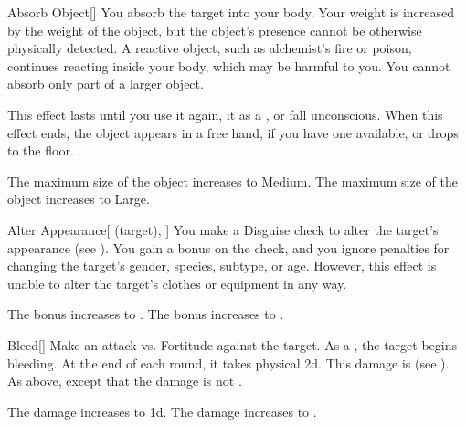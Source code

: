 \lowercase{\hypertarget{spell:Absorb Object}{}}\label{spell:Absorb Object}
\begin{freeability}[Rank 3]{\hypertarget{spell:Absorb Object}{Absorb Object}}[]
You absorb the target into your body.
Your weight is increased by the weight of the object, but the object's presence cannot be otherwise physically detected.
A reactive object, such as alchemist's fire or poison, continues reacting inside your body, which may be harmful to you.
You cannot absorb only part of a larger object.

This effect lasts until you use it again,  it as a , or fall unconscious.
When this effect ends, the object appears in a free hand, if you have one available, or drops to the floor.

\rankline
{} The maximum size of the object increases to Medium.
 The maximum size of the object increases to Large.
\end{freeability}
\vspace{0.25em}



\lowercase{\hypertarget{spell:Alter Appearance}{}}\label{spell:Alter Appearance}
\begin{attuneability}[Rank 3]{\hypertarget{spell:Alter Appearance}{Alter Appearance}}[ (target), ]
You make a Disguise check to alter the target's appearance (see ).
You gain a  bonus on the check, and you ignore penalties for changing the target's gender, species, subtype, or age.
However, this effect is unable to alter the target's clothes or equipment in any way.

\rankline
{} The bonus increases to .
 The bonus increases to .
\end{attuneability}
\vspace{0.25em}



\lowercase{\hypertarget{spell:Bleed}{}}\label{spell:Bleed}
\begin{freeability}[Rank 4]{\hypertarget{spell:Bleed}{Bleed}}[]
Make an attack vs. Fortitude against the target.
\hit As a , the target begins bleeding.
At the end of each round, it takes physical  \minus2d.
This damage is  (see ).
\crit As above, except that the damage is not .

\rankline
{} The damage increases to  \minus1d.
 The damage increases to .
\end{freeability}
\vspace{0.25em}



